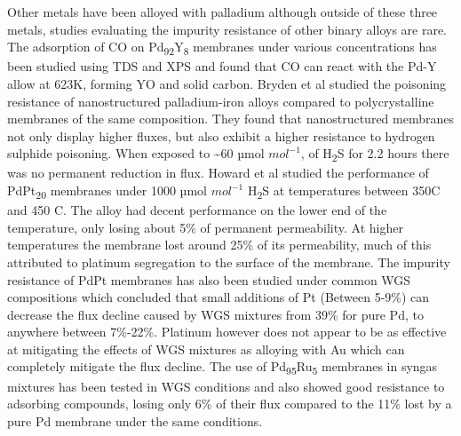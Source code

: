 Other metals have been alloyed with palladium although outside of these three metals, 
studies evaluating the impurity resistance of other binary alloys are rare. The adsorption 
of CO on Pd\textsubscript{92}Y\textsubscript{8} membranes under various concentrations has been studied using TDS and XPS 
and found that CO can react with the Pd-Y allow at 623K, forming YO and solid carbon. \cite{Peng2009a}  
Bryden et al studied the poisoning resistance of nanostructured palladium-iron alloys 
compared to polycrystalline membranes of the same composition. \cite{Bryden2002} They found that 
nanostructured membranes not only display higher fluxes, but also exhibit a higher 
resistance to hydrogen sulphide poisoning. When exposed to \textasciitilde 60 µmol $mol^{-1}$, 
of H\textsubscript{2}S for 2.2 hours there was no permanent reduction in flux. 
Howard et al studied the performance of PdPt\textsubscript{20} membranes under 1000 µmol $mol^{-1}$ 
H\textsubscript{2}S at temperatures between 350\textdegree C and 450 \textdegree C. \cite{Howard2008a} 
The alloy had decent performance on the lower end of the temperature, only losing about 5\% 
of permanent permeability. At higher temperatures the membrane lost around 25\% of its 
permeability, much of this attributed to platinum segregation to the surface of the 
membrane.\cite{Howard2008a} The impurity resistance of PdPt membranes has also been studied under common 
WGS compositions which concluded that small additions of Pt (Between 5-9\%) can decrease 
the flux decline caused by WGS mixtures from 39\% for pure Pd, to anywhere between 7\%-22\%.\cite{Howard2008a}
Platinum however does not appear to be as effective at mitigating the effects of WGS mixtures 
as alloying with Au which can completely mitigate the flux decline. \cite{Gade2011} The use of Pd\textsubscript{95}Ru\textsubscript{5} 
membranes in syngas mixtures has been tested in WGS conditions and also showed good 
resistance to adsorbing compounds, losing only 6\% of their flux compared to the 
11\% lost by a pure Pd membrane under the same conditions.\cite{Ryi2011}

